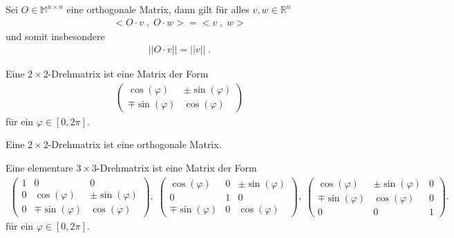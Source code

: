 \begin{Satz}
Sei $O \in \mathbb{M}^{n \times n}$ eine orthogonale Matrix, dann gilt für alles $v,w \in \mathbb{R}^n$
\begin{align*}
< O \cdot v \; , \;  O \cdot w > = <v \; , \; w>
\end{align*}
und somit insbesondere 
\begin{align*}
|| O \cdot v|| = ||v|| \; .
\end{align*}
\end{Satz}


\begin{Definition}
Eine $2 \times 2$-Drehmatrix ist eine Matrix der Form
\begin{align*}
\begin{pmatrix}
\cos(\varphi) & \pm \sin(\varphi) \\  \mp \sin(\varphi) & \cos(\varphi)
\end{pmatrix}
\end{align*}
für ein $\varphi \in [0, 2 \pi]$. 
\end{Definition}

\begin{Bemerkung}
Eine $2 \times 2$-Drehmatrix ist eine orthogonale Matrix.
\end{Bemerkung}



\begin{Definition}
Eine elementare $3 \times 3$-Drehmatrix ist eine Matrix der Form
\begin{align*}
\begin{pmatrix}
1 & 0 & 0 \\
0 & \cos(\varphi) & \pm \sin(\varphi) \\ 
 0 & \mp \sin(\varphi) & \cos(\varphi)
\end{pmatrix}, \;
\begin{pmatrix}
 \cos(\varphi) & 0 &  \pm \sin(\varphi) \\ 
0 & 1 & 0 \\ 
\mp \sin(\varphi) & 0& \cos(\varphi)
\end{pmatrix}, \;
\begin{pmatrix}
 \cos(\varphi) & \pm \sin(\varphi)  & 0\\ 
 \mp \sin(\varphi) & \cos(\varphi) & 0 \\
0 & 0 & 1 
\end{pmatrix}. 
\end{align*} 
für ein $\varphi \in [0, 2 \pi]$. 
\end{Definition}


